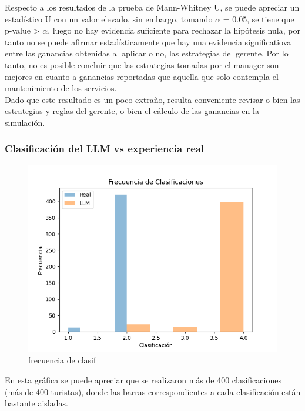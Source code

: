 \documentclass[12pt,a4paper]{article} \usepackage[spanish]{babel} \usepackage{graphicx} \usepackage{amsmath} \usepackage{amsfonts} \usepackage{amssymb} \usepackage{float} \usepackage{geometry}
\begin{document}
Respecto a los resultados de la prueba de Mann-Whitney U, se puede apreciar un estadístico U con un valor elevado, sin embargo, tomando $\alpha$ = 0.05, se tiene que p-value > $\alpha$, luego no hay evidencia suficiente para rechazar la hipótesis nula, por tanto no se puede afirmar estadísticamente que hay una evidencia significatiova entre las ganancias obtenidas al aplicar o no, las estrategias del gerente. Por lo tanto, no es posible concluir que las estrategias tomadas por el manager son mejores en cuanto a ganancias reportadas que aquella que solo contempla el mantenimiento de los servicios.\\
Dado que este resultado es un poco extraño, resulta conveniente revisar o bien las estrategias y reglas del gerente, o bien el cálculo de las ganancias en la simulación.

\subsubsection{Clasificación del LLM vs experiencia real}
\begin{figure}[H] \centering \includegraphics[width=\textwidth]{Frecuencia de clasificaciones} \caption{frecuencia de clasif} \label{fig:etiqueta} \end{figure}
En esta gráfica se puede apreciar que se realizaron más de 400 clasificaciones (más de 400 turistas), donde las barras correspondientes a cada clasificación están bastante aisladas.
\end{document}
